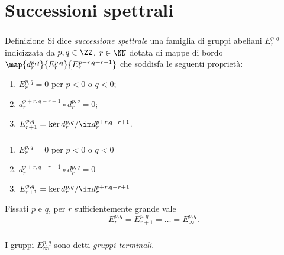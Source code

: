 \section{Successioni spettrali}
\newcommand*{\sseqOne}{\(E^{p,q}_r=0\) per \(p<0\) o \(q<0\)}
\newcommand*{\sseqTwo}{\(d^{p+r,q-r+1}_r\circ d^{p,q}_r=0\)}
\newcommand*{\sseqThree}{\(E^{p,q}_{r+1}=\ker d^{p,q}_r/\im d^{p+r,q-r+1}_r\)}
\begin{frame}
\frametitle{\secname}
\begin{block}{Definizione}
Si dice \emph{successione spettrale} una famiglia di gruppi abeliani \(E^{p,q}_r\) indicizzata da \(p,q\in\ZZ\), \(r\in\NN\) dotata di mappe di bordo \(\map{d^{p,q}_r}{E^{p,q}_r}{E^{p-r,q+r-1}_r}\) che soddisfa le seguenti proprietà:
\begin{enumerate}
\item \sseqOne;
\item \(d^{p+r,q-r+1}_r\circ d^{p,q}_r=0\);
\item \(E^{p,q}_{r+1}=\ker d^{p,q}_r/\im d^{p+r,q-r+1}_r\).
\end{enumerate}
\end{block}
\end{frame}
\begin{frame}
\frametitle{\secname}
\begin{overprint}
\begin{enumerate}
\item \sseqOne\vphantom{\sseqTwo}
\end{enumerate}
\begin{enumerate}
\setcounter{enumi}{1}
\item \sseqTwo
\end{enumerate}
\begin{enumerate}
\setcounter{enumi}{2}
\item \sseqThree
\end{enumerate}
Fissati \(p\) e \(q\), per \(r\) sufficientemente grande vale
\[
E^{p,q}_r=E^{p,q}_{r+1}=\ldots=E^{p,q}_\infty.
\]
\end{overprint}
\vfill
\begin{overprint}
\centering{}
\centering{}
\centering{}
\centering{}
\end{overprint}
\end{frame}
\begin{frame}
\frametitle{\secname}
I gruppi $E^{p,q}_\infty$ sono detti \emph{gruppi terminali}.
\vspace{0.5cm}
\end{frame}
